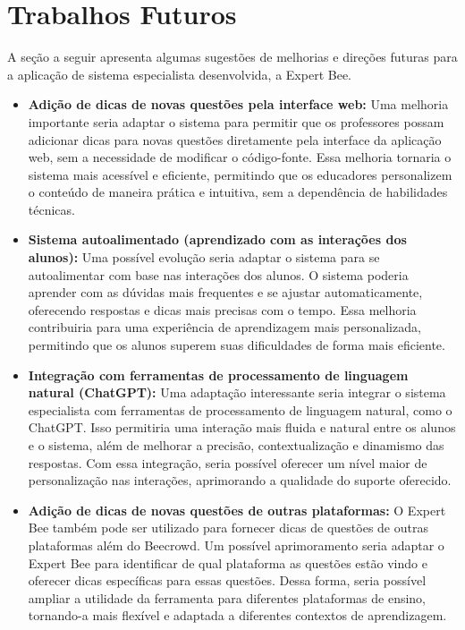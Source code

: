 \section{Trabalhos Futuros}

A seção a seguir apresenta algumas sugestões de melhorias e direções futuras para a aplicação de sistema especialista desenvolvida, a Expert Bee. 

\begin{itemize}
    \item  \textbf{Adição de dicas de novas questões pela interface web:} Uma melhoria importante seria adaptar o sistema para permitir que os professores possam adicionar dicas para novas questões diretamente pela interface da aplicação web, sem a necessidade de modificar o código-fonte. Essa melhoria tornaria o sistema mais acessível e eficiente, permitindo que os educadores personalizem o conteúdo de maneira prática e intuitiva, sem a dependência de habilidades técnicas.
    \item  \textbf{Sistema autoalimentado (aprendizado com as interações dos alunos):} Uma possível evolução seria adaptar o sistema para se autoalimentar com base nas interações dos alunos. O sistema poderia aprender com as dúvidas mais frequentes e se ajustar automaticamente, oferecendo respostas e dicas mais precisas com o tempo. Essa melhoria contribuiria para uma experiência de aprendizagem mais personalizada, permitindo que os alunos superem suas dificuldades de forma mais eficiente.
    \item  \textbf{Integração com ferramentas de processamento de linguagem natural (ChatGPT):} Uma adaptação interessante seria integrar o sistema especialista com ferramentas de processamento de linguagem natural, como o ChatGPT. Isso permitiria uma interação mais fluida e natural entre os alunos e o sistema, além de melhorar a precisão, contextualização e dinamismo das respostas. Com essa integração, seria possível oferecer um nível maior de personalização nas interações, aprimorando a qualidade do suporte oferecido.
    \item  \textbf{Adição de dicas de novas questões de outras plataformas:} O Expert Bee também pode ser utilizado para fornecer dicas de questões de outras plataformas além do Beecrowd. Um possível aprimoramento seria adaptar o Expert Bee para identificar de qual plataforma as questões estão vindo e oferecer dicas específicas para essas questões. Dessa forma, seria possível ampliar a utilidade da ferramenta para diferentes plataformas de ensino, tornando-a mais flexível e adaptada a diferentes contextos de aprendizagem.
\end{itemize}




